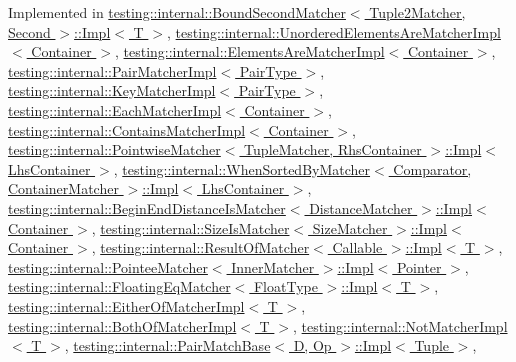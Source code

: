 Implemented in \hyperlink{classtesting_1_1internal_1_1BoundSecondMatcher_1_1Impl_ada7c4fd01c568c48f929dc34b3281aff}{testing\+::internal\+::\+Bound\+Second\+Matcher$<$ Tuple2\+Matcher, Second $>$\+::\+Impl$<$ T $>$}, \hyperlink{classtesting_1_1internal_1_1UnorderedElementsAreMatcherImpl_a3f6e292c6452db028b7671618577d9f0}{testing\+::internal\+::\+Unordered\+Elements\+Are\+Matcher\+Impl$<$ Container $>$}, \hyperlink{classtesting_1_1internal_1_1ElementsAreMatcherImpl_a685f19f64b22a37317332d512c1bce52}{testing\+::internal\+::\+Elements\+Are\+Matcher\+Impl$<$ Container $>$}, \hyperlink{classtesting_1_1internal_1_1PairMatcherImpl_ad4b5139aa8a3cdcc178c9d81b98d95f0}{testing\+::internal\+::\+Pair\+Matcher\+Impl$<$ Pair\+Type $>$}, \hyperlink{classtesting_1_1internal_1_1KeyMatcherImpl_af024a1774c1aedae7b1dc532df7e27af}{testing\+::internal\+::\+Key\+Matcher\+Impl$<$ Pair\+Type $>$}, \hyperlink{classtesting_1_1internal_1_1EachMatcherImpl_a605e1c800c74701a773205ec050cd574}{testing\+::internal\+::\+Each\+Matcher\+Impl$<$ Container $>$}, \hyperlink{classtesting_1_1internal_1_1ContainsMatcherImpl_af47e4e9f890d64e7f8abcdf3f5fb8b3e}{testing\+::internal\+::\+Contains\+Matcher\+Impl$<$ Container $>$}, \hyperlink{classtesting_1_1internal_1_1PointwiseMatcher_1_1Impl_a0c699f62bbd02595471b793baa9cc75e}{testing\+::internal\+::\+Pointwise\+Matcher$<$ Tuple\+Matcher, Rhs\+Container $>$\+::\+Impl$<$ Lhs\+Container $>$}, \hyperlink{classtesting_1_1internal_1_1WhenSortedByMatcher_1_1Impl_a33f7b8bdce4adb02618e90ac2ec949f9}{testing\+::internal\+::\+When\+Sorted\+By\+Matcher$<$ Comparator, Container\+Matcher $>$\+::\+Impl$<$ Lhs\+Container $>$}, \hyperlink{classtesting_1_1internal_1_1BeginEndDistanceIsMatcher_1_1Impl_a5ca27760e15a4f151cd0b964d724c6cf}{testing\+::internal\+::\+Begin\+End\+Distance\+Is\+Matcher$<$ Distance\+Matcher $>$\+::\+Impl$<$ Container $>$}, \hyperlink{classtesting_1_1internal_1_1SizeIsMatcher_1_1Impl_a6b2524886e5fa751e96495a74d75b7cd}{testing\+::internal\+::\+Size\+Is\+Matcher$<$ Size\+Matcher $>$\+::\+Impl$<$ Container $>$}, \hyperlink{classtesting_1_1internal_1_1ResultOfMatcher_1_1Impl_ac414587b112d9fec788366c026fbb485}{testing\+::internal\+::\+Result\+Of\+Matcher$<$ Callable $>$\+::\+Impl$<$ T $>$}, \hyperlink{classtesting_1_1internal_1_1PointeeMatcher_1_1Impl_af56f2efe315e8f4b2c1824de54755f20}{testing\+::internal\+::\+Pointee\+Matcher$<$ Inner\+Matcher $>$\+::\+Impl$<$ Pointer $>$}, \hyperlink{classtesting_1_1internal_1_1FloatingEqMatcher_1_1Impl_aab6dbbe39ef8337e4686ae0f8c81a2c3}{testing\+::internal\+::\+Floating\+Eq\+Matcher$<$ Float\+Type $>$\+::\+Impl$<$ T $>$}, \hyperlink{classtesting_1_1internal_1_1EitherOfMatcherImpl_a0389690d0ce06a1ca447db6281a380d3}{testing\+::internal\+::\+Either\+Of\+Matcher\+Impl$<$ T $>$}, \hyperlink{classtesting_1_1internal_1_1BothOfMatcherImpl_a3a1f92f7b093d36ab38c35fbcae4ce4d}{testing\+::internal\+::\+Both\+Of\+Matcher\+Impl$<$ T $>$}, \hyperlink{classtesting_1_1internal_1_1NotMatcherImpl_a2c22d3e15126decd9c6af132d4f4b60f}{testing\+::internal\+::\+Not\+Matcher\+Impl$<$ T $>$}, \hyperlink{classtesting_1_1internal_1_1PairMatchBase_1_1Impl_a15875cb34c31a19a8decad64899fff3f}{testing\+::internal\+::\+Pair\+Match\+Base$<$ D, Op $>$\+::\+Impl$<$ Tuple $>$}, 